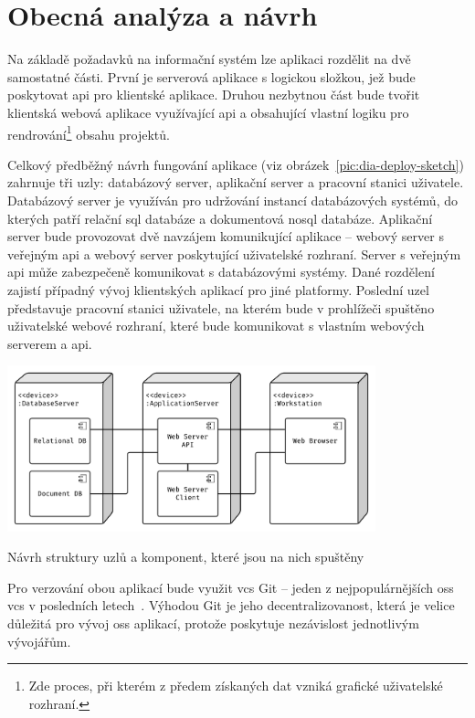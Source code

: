 \chapter{Obecná analýza a návrh}

Na základě požadavků na informační systém lze aplikaci rozdělit na dvě samostatné části. První je serverová aplikace s logickou složkou, jež bude poskytovat \gls{api} pro klientské aplikace. Druhou nezbytnou část bude tvořit klientská webová aplikace využívající \gls{api} a obsahující vlastní logiku pro rendrování\footnote{Zde proces, při kterém z předem získaných dat vzniká grafické uživatelské rozhraní.} obsahu projektů.

Celkový předběžný návrh fungování aplikace (viz obrázek~\ref{pic:dia-deploy-sketch}) zahrnuje tři uzly: databázový server, aplikační server a pracovní stanici uživatele. Databázový server je využíván pro udržování instancí databázových systémů, do kterých patří relační \gls{sql} databáze a dokumentová \gls{nosql} databáze. Aplikační server bude provozovat dvě navzájem komunikující aplikace -- webový server s veřejným \gls{api} a webový server poskytující uživatelské rozhraní. Server s veřejným \gls{api} může zabezpečeně komunikovat s databázovými systémy. Dané rozdělení zajistí případný vývoj klientských aplikací pro jiné platformy. Poslední uzel představuje pracovní stanici uživatele, na kterém bude v prohlížeči spuštěno uživatelské webové rozhraní, které bude komunikovat s vlastním webových serverem a \gls{api}.

\begin{fig:illustration}
   \includegraphics[width=0.8\textwidth]{images/dia-deploy-sketch.pdf}
   \caption{Návrh struktury uzlů a komponent, které jsou na nich spuštěny}\label{pic:dia-deploy-sketch}
\end{fig:illustration}

Pro verzování obou aplikací bude využit \gls{vcs} Git -- jeden z nejpopulárnějších \gls{oss} \gls{vcs} v posledních letech~\cite{vcsG2}. Výhodou Git je jeho decentralizovanost, která je velice důležitá pro vývoj \gls{oss} aplikací, protože poskytuje nezávislost jednotlivým vývojářům.



